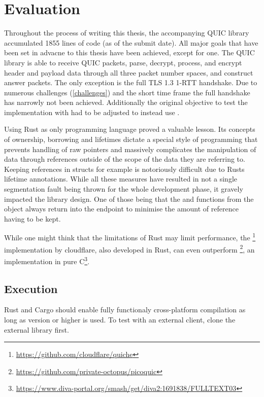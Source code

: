 \chapter{Evaluation}

Throughout the process of writing this thesis, the accompanying QUIC library accumulated 1855 lines of code (as of the submit date).
All major goals that have been set in advacne to this thesis have been achieved, except for one. The QUIC library is able to receive
QUIC packets, parse, decrypt, process, and encrypt header and payload data through all three packet number spaces, and construct
answer packets. The only exception is the full TLS 1.3 1-RTT handshake. Due to numerous challenges (\ref{challenges}) and the short
time frame the full handshake has narrowly not been achieved. Additionally the original objective to test the implementation with
 had to be adjusted to instead use . 

Using Rust as only programming language proved a valuable lesson. Its concepts of ownership, borrowing and lifetimes dictate a
special style of programming that prevents handling of raw pointers and massively complicates the manipulation of data through
references outside of the scope of the data they are referring to. Keeping references in structs for example is notoriously
difficult due to Rusts lifetime annotations. While all these measures have resulted in not a single segmentation fault being
thrown for the whole development phase, it gravely impacted the library design. One of those being that the 
and  functions from the  object always return into the endpoint to minimise the
amount of reference having to be kept. 

While one might think that the limitations of Rust may limit performance, the
\footnote{\url{https://github.com/cloudflare/quiche}} implementation by cloudflare, also developed in Rust,
can even outperform \footnote{\url{https://github.com/private-octopus/picoquic}}, an implementation in
pure C\footnote{\url{https://www.diva-portal.org/smash/get/diva2:1691838/FULLTEXT03}}.

\section{Execution}
Rust and Cargo should enable fully functionaly cross-platform compilation as long as  version 
or higher is used. To test with an external client, clone the external library  first.

